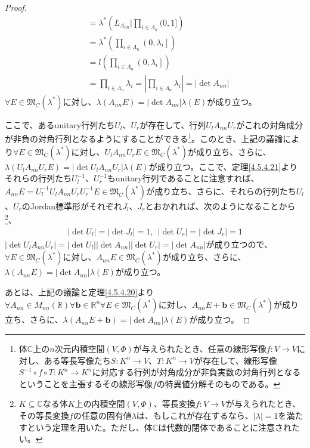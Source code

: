 \documentclass[dvipdfmx]{jsarticle}
\begin{document}
\begin{proof}
\begin{align*}
&= \lambda^{*}\left( L_{A_{nn}}|\prod_{i \in \varLambda_{n}} (0,1] \right)\\
&= \lambda^{*}\left( \prod_{i \in \varLambda_{n}} \left( 0,\lambda_{i} \right] \right)\\
&= l\left( \prod_{i \in \varLambda_{n}} \left( 0,\lambda_{i} \right] \right)\\
&= \prod_{i \in \varLambda_{n}} \lambda_{i} = \left| \prod_{i \in \varLambda_{n}} \lambda_{i} \right| = \left| \det A_{nn} \right|
\end{align*}
$\forall E \in \mathfrak{M}_{C}\left( \lambda^{*} \right)$に対し、$\lambda\left( A_{nn}E \right) = \left| \det A_{nn} \right|\lambda(E)$が成り立つ。\par
ここで、あるunitary行列たち$U_{l}$、$U_{r}$が存在して、行列$U_{l}A_{nn}U_{r}$がこれの対角成分が非負の対角行列となるようにすることができる\footnote{体$\mathbb{C}$上の$n$次元内積空間$(V,\varPhi)$が与えられたとき、任意の線形写像$f:V \rightarrow V$に対し、ある等長写像たち$S:K^{n} \rightarrow V$、$T:K^{n} \rightarrow V$が存在して、線形写像$S^{- 1} \circ f \circ T:K^{n} \rightarrow K^{n}$に対応する行列が対角成分が非負実数の対角行列となるということを主張するその線形写像$f$の特異値分解そのものである。}。このとき、上記の議論により$\forall E \in \mathfrak{M}_{C}\left( \lambda^{*} \right)$に対し、$U_{l}A_{nn}U_{r}E \in \mathfrak{M}_{C}\left( \lambda^{*} \right)$が成り立ち、さらに、$\lambda\left( U_{l}A_{nn}U_{r}E \right) = \left| \det{U_{l}A_{nn}U_{r}} \right|\lambda(E)$が成り立つ。ここで、定理\ref{4.5.4.21}よりそれらの行列たち$U_{l}^{- 1}$、$U_{r}^{- 1}$もunitary行列であることに注意すれば、$A_{nn}E = U_{l}^{- 1}U_{l}A_{nn}U_{r}U_{r}^{- 1}E \in \mathfrak{M}_{C}\left( \lambda^{*} \right)$が成り立ち、さらに、それらの行列たち$U_{l}$、$U_{r}$のJordan標準形がそれぞれ$J_{l}$、$J_{r}$とおかれれば、次のようになることから\footnote{$K \subseteq \mathbb{C}$なる体$K$上の内積空間$(V,\varPhi)$、等長変換$f:V \rightarrow V$が与えられたとき、その等長変換$f$の任意の固有値$\lambda$は、もしこれが存在するなら、$|\lambda| = 1$を満たすという定理を用いた。ただし、体$\mathbb{C}$は代数的閉体であることに注意されたい。}、
\begin{align*}
\left| \det U_{l} \right| = \left| \det J_{l} \right| = 1,\ \ \left| \det U_{r} \right| = \left| \det J_{r} \right| = 1
\end{align*}
$\left| \det{U_{l}A_{nn}U_{r}} \right| = \left| \det U_{l} \right|\left| \det A_{nn} \right|\left| \det U_{r} \right| = \left| \det A_{nn} \right|$が成り立つので、$\forall E \in \mathfrak{M}_{C}\left( \lambda^{*} \right)$に対し、$A_{nn}E \in \mathfrak{M}_{C}\left( \lambda^{*} \right)$が成り立ち、さらに、$\lambda\left( A_{nn}E \right) = \left| \det A_{nn} \right|\lambda(E)$が成り立つ。\par
あとは、上記の議論と定理\ref{4.5.4.20}より$\forall A_{nn} \in M_{nn}\left( \mathbb{R} \right)\forall\mathbf{b} \in \mathbb{R}^{n}\forall E \in \mathfrak{M}_{C}\left( \lambda^{*} \right)$に対し、$A_{nn}E + \mathbf{b} \in \mathfrak{M}_{C}\left( \lambda^{*} \right)$が成り立ち、さらに、$\lambda\left( A_{nn}E + \mathbf{b} \right) = \left| \det A_{nn} \right|\lambda(E)$が成り立つ。
\end{proof}
\end{document}
